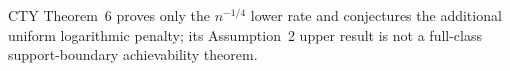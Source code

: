 CTY Theorem~6 proves only the \(n^{-1/4}\) lower rate and conjectures the additional uniform logarithmic penalty; its Assumption~2 upper result is not a full-class support-boundary achievability theorem.
